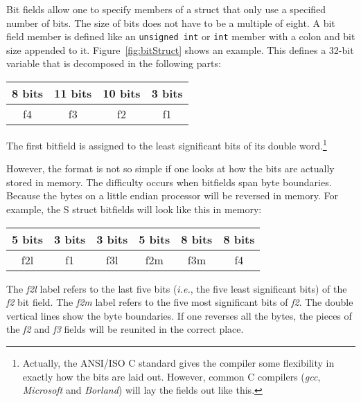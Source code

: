 Bit fields allow one to specify members of a struct that only use a specified
number of bits. The size of bits does not have to be a multiple of eight. A
bit field member is defined like an \lstinline|unsigned int| or \lstinline|int|
member with a colon and bit size appended to it. Figure~\ref{fig:bitStruct}
shows an example. This defines a 32-bit variable that is decomposed in the 
following parts:
\begin{center}
\begin{tabular}{|c|c|c|c|}
\multicolumn{1}{c}{8 bits} & \multicolumn{1}{c}{11 bits} 
& \multicolumn{1}{c}{10 bits} & \multicolumn{1}{c}{3 bits} \\ \hline
\hspace{2em} f4 \hspace{2em} & \hspace{3em} f3 \hspace{3em}
& \hspace{3em} f2 \hspace{3em} & f1 \\
\hline
\end{tabular}
\end{center}
The first bitfield is assigned to the least significant bits of its
double word.\footnote{Actually, the ANSI/ISO C standard gives the
compiler some flexibility in exactly how the bits are laid
out. However, common C compilers (\emph{gcc}, \emph{Microsoft} and
\emph{Borland}) will lay the fields out like this.}

However, the format is not so simple if one looks at how the bits are actually
stored in memory. The difficulty occurs when bitfields span byte boundaries.
Because the bytes on a little endian processor will be reversed in memory. For
example, the {\code S} struct bitfields will look like this in memory:
\begin{center}
\begin{tabular}{|c|c||c|c||c||c|}
\multicolumn{1}{c}{5 bits} & \multicolumn{1}{c}{3 bits} 
& \multicolumn{1}{c}{3 bits} & \multicolumn{1}{c}{5 bits} 
& \multicolumn{1}{c}{8 bits} & \multicolumn{1}{c}{8 bits} \\ \hline
f2l & f1 &  f3l  & f2m & \hspace{1em} f3m \hspace{1em} 
& \hspace{1.5em} f4 \hspace{1.5em} \\
\hline
\end{tabular}
\end{center}
The \emph{f2l} label refers to the last five bits (\emph{i.e.}, the five least
significant bits) of the \emph{f2} bit field. The \emph{f2m} label refers to the
five most significant bits of \emph{f2}. The double vertical lines show the byte
boundaries. If one reverses all the bytes, the pieces of the \emph{f2} and \emph{f3}
fields will be reunited in the correct place.

